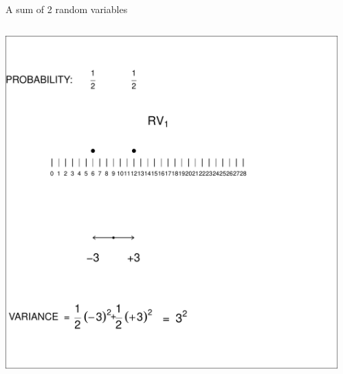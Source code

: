 \documentclass[10pt,handout]{beamer}\usepackage[]{graphicx}\usepackage[]{color}
\newenvironment{knitrout}{}{} %
\begin{document}
\begin{frame}[fragile]{A sum of 2 random variables}
	

	
	
	
		\begin{columns}
		\begin{column}{0.5\textwidth}  %
\begin{knitrout}\tiny
{}\color{fgcolor}

{\centering \includegraphics[width=1\linewidth]{figure/unnamed-chunk-8-1} 

}


\end{knitrout}
			
					\end{column}
		\begin{column}{0.5\textwidth}
\begin{knitrout}\tiny
{}\color{fgcolor}


\end{knitrout}
\end{column}
\end{columns}
\end{frame}
\end{document}
